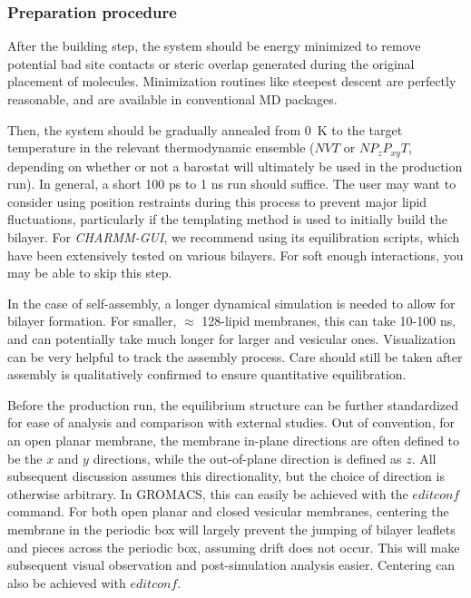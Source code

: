 \documentclass[9pt,bestpractices,pubversion]{livecoms}
\begin{document}
\subsubsection{Preparation procedure}
\label{subsubsec:prepproc}
After the building step, the system should be energy minimized to remove potential bad site contacts or steric overlap generated during the original placement of molecules.
Minimization routines like steepest descent are perfectly reasonable, and are available in conventional MD packages.

Then, the system should be gradually annealed from 0~K to the target temperature in the relevant thermodynamic ensemble ($NVT$ or $NP_{z}P_{xy}T$, depending on whether or not a barostat will ultimately be used in the production run).
In general, a short 100 ps to 1 ns run should suffice.
The user may want to consider using position restraints during this process to prevent major lipid fluctuations, particularly if the templating method is used to initially build the bilayer.
For \textit{CHARMM-GUI}, we recommend using its equilibration scripts, which have been extensively tested on various bilayers.
For soft enough interactions, you may be able to skip this step.

In the case of self-assembly, a longer dynamical simulation is needed to allow for bilayer formation.
For smaller, $\approx$ 128-lipid membranes, this can take 10-100 ns, and can potentially take much longer for larger and vesicular ones.
Visualization can be very helpful to track the assembly process.
Care should still be taken after assembly is qualitatively confirmed to ensure quantitative equilibration.

Before the production run, the equilibrium structure can be further standardized for ease of analysis and comparison with external studies.
Out of convention, for an open planar membrane, the membrane in-plane directions are often defined to be the $x$ and $y$ directions, while the out-of-plane direction is defined as $z$.
All subsequent discussion assumes this directionality, but the choice of direction is otherwise arbitrary.
In GROMACS, this can easily be achieved with the $editconf$ command.
For both open planar and closed vesicular membranes, centering the membrane in the periodic box will largely prevent the jumping of bilayer leaflets and pieces across the periodic box, assuming drift does not occur.
This will make subsequent visual observation and post-simulation analysis easier.
Centering can also be achieved with $editconf$.
\end{document}
